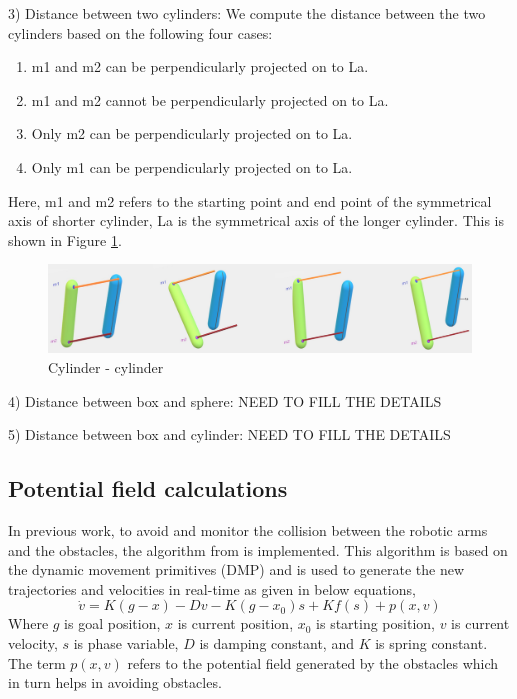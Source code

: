 \documentclass[a4paper, 11.5pt, conference]{ieeeconf}      %
\begin{document}
3) Distance between two cylinders:
We compute the distance between the two cylinders based on the following four cases:
\begin{enumerate}
	\item m1 and m2 can be perpendicularly projected on to La.
	\item m1 and m2 cannot be perpendicularly projected on to La.
	\item Only m2 can be perpendicularly projected on to La.
	\item Only m1 can be perpendicularly projected on to La.
\end{enumerate}
Here, m1 and m2 refers to the starting point and end point of the symmetrical axis of shorter cylinder, La is the symmetrical axis of the longer cylinder. This is shown in Figure \ref{fig:capsule_capsule}.
\begin{figure}[H]
    \centering
    \includegraphics[scale=0.21]{images/capsule_capsule.png}
    \caption{Cylinder - cylinder}
    \label{fig:capsule_capsule}
\end{figure}

4) Distance between box and sphere:
NEED TO FILL THE DETAILS

5) Distance between box and cylinder:
NEED TO FILL THE DETAILS

\subsection{Potential field calculations}
In previous work, to avoid and monitor the collision between the robotic arms and the obstacles, the algorithm from \cite{Hoffmann} is implemented. This algorithm is based on the dynamic movement primitives (DMP) and is used to generate the new trajectories and velocities in real-time as given in below equations,
\begin{equation} \label{eq:1}
	\dot{v} = K ( g - x ) - D v - K (g - x_0) s + K f(s) + p(x, v)
\end{equation}
Where $g$ is goal position, $x$ is current position, $x_0$ is starting position, $v$ is current velocity, $s$ is phase variable, $D$ is damping constant, and $K$ is spring constant. The term $p(x,v)$ refers to the potential field generated by the obstacles which in turn helps in avoiding obstacles.
\end{document}
